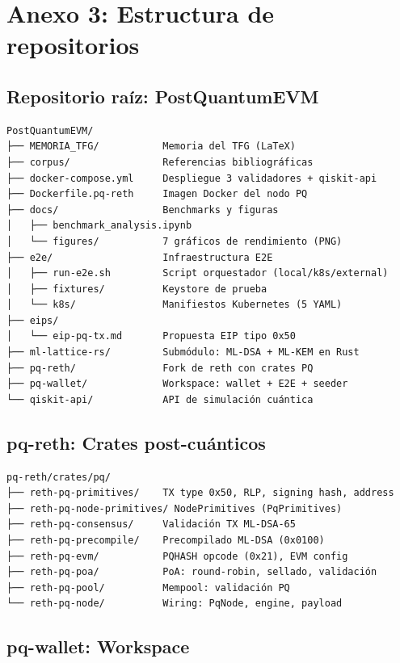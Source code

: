 \section{Anexo 3: Estructura de repositorios}
\label{sec:anexo_repos}

\subsection*{Repositorio raíz: PostQuantumEVM}

\begin{verbatim}
PostQuantumEVM/
├── MEMORIA_TFG/           Memoria del TFG (LaTeX)
├── corpus/                Referencias bibliográficas
├── docker-compose.yml     Despliegue 3 validadores + qiskit-api
├── Dockerfile.pq-reth     Imagen Docker del nodo PQ
├── docs/                  Benchmarks y figuras
│   ├── benchmark_analysis.ipynb
│   └── figures/           7 gráficos de rendimiento (PNG)
├── e2e/                   Infraestructura E2E
│   ├── run-e2e.sh         Script orquestador (local/k8s/external)
│   ├── fixtures/          Keystore de prueba
│   └── k8s/               Manifiestos Kubernetes (5 YAML)
├── eips/
│   └── eip-pq-tx.md       Propuesta EIP tipo 0x50
├── ml-lattice-rs/         Submódulo: ML-DSA + ML-KEM en Rust
├── pq-reth/               Fork de reth con crates PQ
├── pq-wallet/             Workspace: wallet + E2E + seeder
└── qiskit-api/            API de simulación cuántica
\end{verbatim}

\subsection*{pq-reth: Crates post-cuánticos}

\begin{verbatim}
pq-reth/crates/pq/
├── reth-pq-primitives/    TX type 0x50, RLP, signing hash, address
├── reth-pq-node-primitives/ NodePrimitives (PqPrimitives)
├── reth-pq-consensus/     Validación TX ML-DSA-65
├── reth-pq-precompile/    Precompilado ML-DSA (0x0100)
├── reth-pq-evm/           PQHASH opcode (0x21), EVM config
├── reth-pq-poa/           PoA: round-robin, sellado, validación
├── reth-pq-pool/          Mempool: validación PQ
└── reth-pq-node/          Wiring: PqNode, engine, payload
\end{verbatim}

\subsection*{pq-wallet: Workspace}

